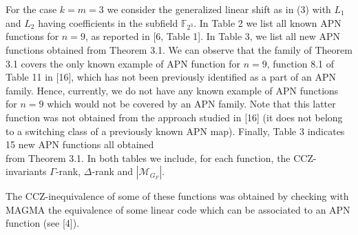 \documentclass[10pt]{article}
\begin{document}
For the case $k=m=3$ we consider the generalized linear shift as in (3) with $L_{1}$ and $L_{2}$ having coefficients in the subfield $\mathbb{F}_{2^{3}}$. In Table 2 we list all known APN functions for $n=9$, as reported in [6, Table 1]. In Table 3, we list all new APN functions obtained from Theorem 3.1. We can observe that the family of Theorem 3.1 covers the only known example of APN function for $n=9$, function 8.1 of Table 11 in [16], which has not been previously identified as a part of an APN family. Hence, currently, we do not have any known example of APN functions for $n=9$ which would not be covered by an APN family. Note that this latter function was not obtained from the approach studied in [16] (it does not belong to a switching class of a previously known APN map). Finally, Table 3 indicates 15 new APN functions all obtained\\
from Theorem 3.1. In both tables we include, for each function, the CCZ-invariants $\Gamma$-rank, $\Delta$-rank and $\left|\mathscr{M}_{G_{F}}\right|$.

The CCZ-inequivalence of some of these functions was obtained by checking with MAGMA the equivalence of some linear code which can be associated to an APN function (see [4]).
\end{document}
